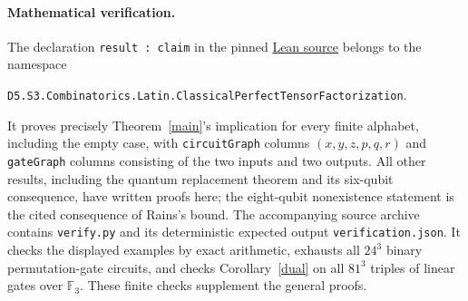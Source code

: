 \documentclass[11pt]{article}
\begin{document}
\paragraph{Mathematical verification.}
The declaration \texttt{result : claim} in the pinned
\href{https://github.com/the-omega-institute/trureturing/blob/6715a5bea38a03c80f6c4da6de93fea88798f026/D5/S3/Combinatorics/Latin/ClassicalPerfectTensorFactorization.lean}{Lean source}
belongs to the namespace
\begin{center}\small
\nolinkurl{D5.S3.Combinatorics.Latin.ClassicalPerfectTensorFactorization}.
\end{center}
It proves precisely
Theorem~\ref{main}'s implication for every finite alphabet, including the
empty case, with \texttt{circuitGraph} columns $(x,y,z,p,q,r)$ and
\texttt{gateGraph} columns consisting of the two inputs and two outputs.
All other results, including the quantum replacement theorem and its
six-qubit consequence, have written proofs here; the eight-qubit
nonexistence statement is the cited consequence of Rains's bound.
The accompanying source
archive contains \texttt{verify.py} and its deterministic expected output
\texttt{verification.json}. It checks the displayed examples by exact
arithmetic, exhausts all $24^3$ binary permutation-gate circuits, and
checks Corollary~\ref{dual} on all $81^3$ triples of linear gates over
$\mathbb F_3$. These finite checks supplement the general proofs.
\end{document}
